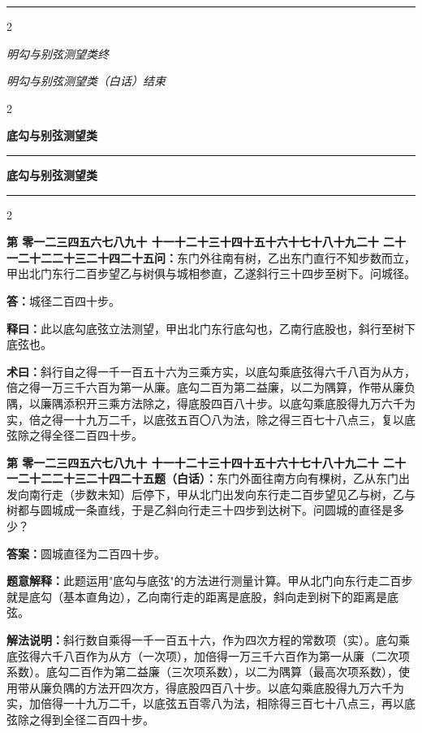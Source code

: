 \documentclass[10pt,a4paper]{article}
\newcommand{\longline}{\noindent\rule{\textwidth}{0.4pt}}
\newcounter{probnum}
\newcounter{probnumvol}[section]
\newcommand{\chnum}[1]{%
  \ifcase#1 零\or 一\or 二\or 三\or 四\or 五\or 六\or 七\or 八\or 九\or 十\or
    十一\or 十二\or 十三\or 十四\or 十五\or 十六\or 十七\or 十八\or 十九\or 二十\or
    二十一\or 二十二\or 二十三\or 二十四\or 二十五\fi}
\newcommand{\problemclassical}[1]{%
  \stepcounter{probnumvol}%
  \par\noindent
  \textcolor{classicalcolor}{\textbf{第\chnum{\value{probnumvol}}问：}}#1\par\smallskip
}
\newcommand{\problemmodern}[1]{%
  \par\noindent
  \textcolor{moderncolor}{\textbf{第\chnum{\value{probnumvol}}题（白话）：}}#1\par\smallskip
}
\newcommand{\answerclassical}[1]{%
  \par\noindent\textcolor{classicalcolor}{\textbf{答：}}#1\par
}
\newcommand{\answermodern}[1]{%
  \par\noindent\textcolor{moderncolor}{\textbf{答案：}}#1\par
}
\newcommand{\shiyiclassical}[1]{%
  \par\noindent\textcolor{classicalcolor}{\textbf{释曰：}}#1\par
}
\newcommand{\shiyimodern}[1]{%
  \par\noindent\textcolor{moderncolor}{\textbf{题意解释：}}#1\par
}
\newcommand{\shuyueclassical}[1]{%
  \par\noindent\textcolor{classicalcolor}{\textbf{术曰：}}#1\par
}
\newcommand{\shuyuemodern}[1]{%
  \par\noindent\textcolor{moderncolor}{\textbf{解法说明：}}#1\par
}
\newcommand{\volheaderclassical}[1]{%
  \begin{center}{\large\bfseries\color{volcolor} #1}\end{center}
  \vspace{0.3cm}
  \longline
  \vspace{0.3cm}
}
\newcommand{\volheadermodern}[1]{%
  \begin{center}{\large\bfseries\color{volcolor} #1}\end{center}
  \vspace{0.3cm}
  \longline
  \vspace{0.3cm}
}
\newcommand{\endclassical}[1]{%
  \vspace{0.3cm}
  \begin{center}\textit{#1}\end{center}
}
\newcommand{\endmodern}[1]{%
  \vspace{0.3cm}
  \begin{center}\textit{#1}\end{center}
}
\begin{document}
\vspace{0.5cm}
\longline
\begin{paracol}{2}
\endclassical{明勾与别弦测望类终}
\switchcolumn
\endmodern{明勾与别弦测望类（白话）结束}
\end{paracol}

\newpage

\setcounter{probnumvol}{0}

\begin{paracol}{2}

\volheaderclassical{底勾与别弦测望类}

\switchcolumn

\volheadermodern{底勾与别弦测望类}

\end{paracol}

\begin{paracol}{2}

\problemclassical{东门外往南有树，乙出东门直行不知步数而立，甲出北门东行二百步望乙与树俱与城相参直，乙遂斜行三十四步至树下。问城径。}

\answerclassical{城径二百四十步。}

\shiyiclassical{此以底勾底弦立法测望，甲出北门东行底勾也，乙南行底股也，斜行至树下底弦也。}

\shuyueclassical{斜行自之得一千一百五十六为三乘方实，以底勾乘底弦得六千八百为从方，倍之得一万三千六百为第一从廉。底勾二百为第二益廉，以二为隅算，作带从廉负隅，以廉隅添积开三乘方法除之，得底股四百八十步。以底勾乘底股得九万六千为实，倍之得一十九万二千，以底弦五百〇八为法，除之得三百七十八点三，复以底弦除之得全径二百四十步。}

\switchcolumn

\problemmodern{东门外面往南方向有棵树，乙从东门出发向南行走（步数未知）后停下，甲从北门出发向东行走二百步望见乙与树，乙与树都与圆城成一条直线，于是乙斜向行走三十四步到达树下。问圆城的直径是多少？}

\answermodern{圆城直径为二百四十步。}

\shiyimodern{此题运用"底勾与底弦"的方法进行测量计算。甲从北门向东行走二百步就是底勾（基本直角边），乙向南行走的距离是底股，斜向走到树下的距离是底弦。}

\shuyuemodern{斜行数自乘得一千一百五十六，作为四次方程的常数项（实）。底勾乘底弦得六千八百作为从方（一次项），加倍得一万三千六百作为第一从廉（二次项系数）。底勾二百作为第二益廉（三次项系数），以二为隅算（最高次项系数），使用带从廉负隅的方法开四次方，得底股四百八十步。以底勾乘底股得九万六千为实，加倍得一十九万二千，以底弦五百零八为法，相除得三百七十八点三，再以底弦除之得到全径二百四十步。}

\end{paracol}
\end{document}
